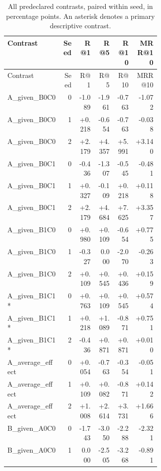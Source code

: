 \begingroup\footnotesize
\setlength{\tabcolsep}{3pt}
\begin{longtable}{@{}p{0.36\linewidth}rrrrr@{}}
\caption{All predeclared contrasts, paired within seed, in percentage points. An asterisk denotes a primary descriptive contrast.}\\
\toprule
Contrast & Seed & R@1 & R@5 & R@10 & MRR@10 \\
\midrule\endfirsthead
\toprule
Contrast & Seed & R@1 & R@5 & R@10 & MRR@10 \\
\midrule\endhead
\bottomrule\endfoot
A\_\allowbreak{}given\_\allowbreak{}B0C0 & 0 & -1.089 & -1.961 & -0.763 & -1.072 \\
A\_\allowbreak{}given\_\allowbreak{}B0C0 & 1 & +0.218 & -0.654 & -0.763 & -0.038 \\
A\_\allowbreak{}given\_\allowbreak{}B0C0 & 2 & +2.179 & +4.357 & +5.991 & +3.140 \\
A\_\allowbreak{}given\_\allowbreak{}B0C1 & 0 & -0.436 & -1.307 & -0.545 & -0.481 \\
A\_\allowbreak{}given\_\allowbreak{}B0C1 & 1 & +0.327 & -0.109 & +0.218 & +0.118 \\
A\_\allowbreak{}given\_\allowbreak{}B0C1 & 2 & +2.179 & +4.684 & +7.625 & +3.357 \\
A\_\allowbreak{}given\_\allowbreak{}B1C0 & 0 & +0.980 & +0.109 & -0.654 & +0.775 \\
A\_\allowbreak{}given\_\allowbreak{}B1C0 & 1 & -0.327 & 0.000 & -2.070 & -0.263 \\
A\_\allowbreak{}given\_\allowbreak{}B1C0 & 2 & +0.109 & +0.545 & +0.436 & +0.159 \\
A\_\allowbreak{}given\_\allowbreak{}B1C1* & 0 & +0.763 & +0.109 & +0.545 & +0.574 \\
A\_\allowbreak{}given\_\allowbreak{}B1C1* & 1 & +0.218 & +1.089 & -0.871 & +0.751 \\
A\_\allowbreak{}given\_\allowbreak{}B1C1* & 2 & -0.436 & +0.871 & +0.871 & +0.010 \\
A\_\allowbreak{}average\_\allowbreak{}effect & 0 & +0.054 & -0.763 & -0.354 & -0.051 \\
A\_\allowbreak{}average\_\allowbreak{}effect & 1 & +0.109 & +0.082 & -0.871 & +0.142 \\
A\_\allowbreak{}average\_\allowbreak{}effect & 2 & +1.008 & +2.614 & +3.731 & +1.666 \\
B\_\allowbreak{}given\_\allowbreak{}A0C0 & 0 & -1.743 & -3.050 & -2.288 & -2.321 \\
B\_\allowbreak{}given\_\allowbreak{}A0C0 & 1 & 0.000 & -2.505 & -3.268 & -0.891 \\

\end{longtable}

